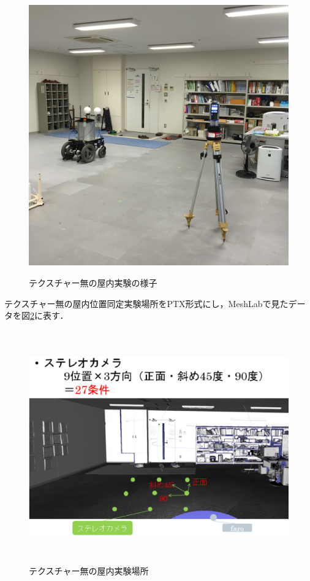 %
\vspace{5mm}
\begin{figure}[htbp]
  \begin{center}
   \includegraphics[height=120mm]{figure/テクスチャー無の屋内実験のキャップチャ－.eps}
   \caption{テクスチャー無の屋内実験の様子}
   \label{テクスチャー無の屋内実験のキャップチャ－}
  \end{center}
\end{figure}

\newpage

テクスチャー無の屋内位置同定実験場所をPTX形式にし，MeshLabで見たデータを図{\ref{屋内実験場所}}に表す．\par
%
\begin{figure}[htbp]
  \begin{center}
   \includegraphics[height=100mm]{figure/屋内実験場所.eps}
   \caption{テクスチャー無の屋内実験場所}
   \label{屋内実験場所}
  \end{center}
\end{figure}
%


